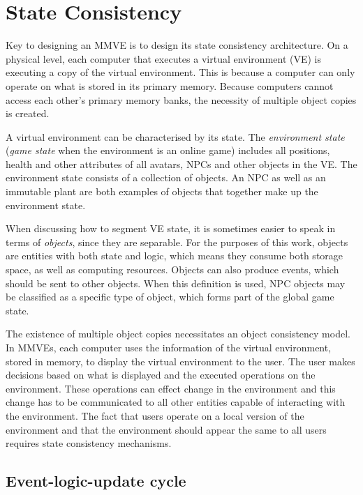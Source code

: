 \chapter{State Consistency}
\label{chp:CONSISTENCY}

Key to designing an MMVE is to design its state consistency architecture. On a physical level, each computer that executes a virtual environment (VE) is executing a copy of the virtual environment. This is because a computer can only operate on what is stored in its primary memory. Because computers cannot access each other's primary memory banks, the necessity of multiple object copies is created.

A virtual environment can be characterised by its state. The \emph{environment state} (\emph{game state} when the environment is an online game) includes all positions, health and other attributes of all avatars, NPCs and other objects in the VE. The environment state consists of a collection of objects. An NPC as well as an immutable plant are both examples of objects that together make up the environment state.

When discussing how to segment VE state, it is sometimes easier to speak in terms of \emph{objects}, since they are separable. For the purposes of this work, objects are entities with both state and logic, which means they consume both storage space, as well as computing resources. Objects can also produce events, which should be sent to other objects. When this definition is used, NPC objects may be classified as a specific type of object, which forms part of the global game state.

The existence of multiple object copies necessitates an object consistency model. In MMVEs, each computer uses the information of the virtual environment, stored in memory, to display the virtual environment to the user. The user makes decisions based on what is displayed and the executed operations on the environment. These operations can effect change in the environment and this change has to be communicated to all other entities capable of interacting with the environment. The fact that users operate on a local version of the environment and that the environment should appear the same to all users requires state consistency mechanisms.

\section{Event-logic-update cycle}
\label{event_logic_update}

